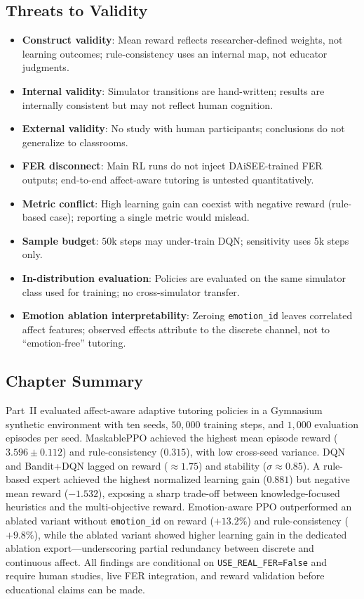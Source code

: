 \subsection{Threats to Validity}\label{sec:results_adapt_validity}

\begin{itemize}
    \item \textbf{Construct validity}: Mean reward reflects researcher-defined weights, not learning outcomes; rule-consistency uses an internal map, not educator judgments.
    \item \textbf{Internal validity}: Simulator transitions are hand-written; results are internally consistent but may not reflect human cognition.
    \item \textbf{External validity}: No study with human participants; conclusions do not generalize to classrooms.
    \item \textbf{FER disconnect}: Main RL runs do not inject DAiSEE-trained FER outputs; end-to-end affect-aware tutoring is untested quantitatively.
    \item \textbf{Metric conflict}: High learning gain can coexist with negative reward (rule-based case); reporting a single metric would mislead.
    \item \textbf{Sample budget}: $50$k steps may under-train DQN; sensitivity uses $5$k steps only.
    \item \textbf{In-distribution evaluation}: Policies are evaluated on the same simulator class used for training; no cross-simulator transfer.
    \item \textbf{Emotion ablation interpretability}: Zeroing \texttt{emotion\_id} leaves correlated affect features; observed effects attribute to the discrete channel, not to ``emotion-free'' tutoring.
\end{itemize}

\subsection{Chapter Summary}\label{sec:results_adapt_summary}

Part~II evaluated affect-aware adaptive tutoring policies in a Gymnasium synthetic environment with ten seeds, $50{,}000$ training steps, and $1{,}000$ evaluation episodes per seed. MaskablePPO achieved the highest mean episode reward ($3.596 \pm 0.112$) and rule-consistency ($0.315$), with low cross-seed variance. DQN and Bandit+DQN lagged on reward ($\approx 1.75$) and stability ($\sigma \approx 0.85$). A rule-based expert achieved the highest normalized learning gain ($0.881$) but negative mean reward ($-1.532$), exposing a sharp trade-off between knowledge-focused heuristics and the multi-objective reward. Emotion-aware PPO outperformed an ablated variant without \texttt{emotion\_id} on reward ($+13.2\%$) and rule-consistency ($+9.8\%$), while the ablated variant showed higher learning gain in the dedicated ablation export---underscoring partial redundancy between discrete and continuous affect. All findings are conditional on \texttt{USE\_REAL\_FER=False} and require human studies, live FER integration, and reward validation before educational claims can be made.


